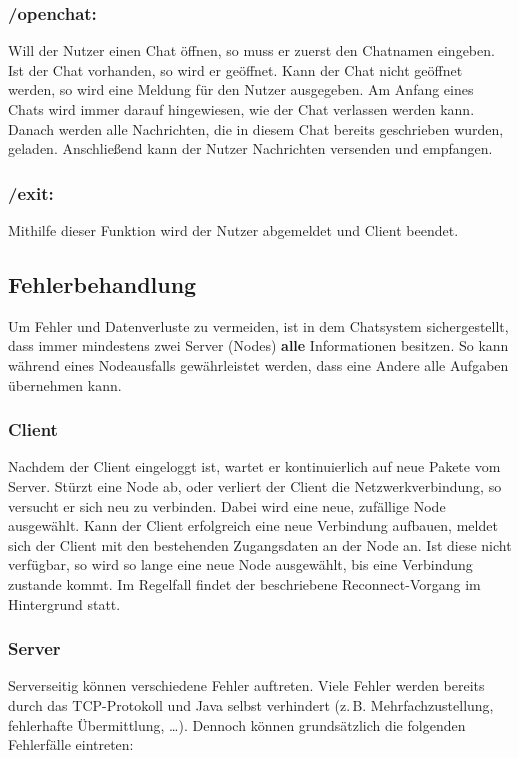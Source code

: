 \subsubsection*{/openchat:}
Will der Nutzer einen Chat öffnen, so muss er zuerst den Chatnamen eingeben. Ist der Chat vorhanden, so wird er geöffnet.
Kann der Chat nicht geöffnet werden, so wird eine Meldung für den Nutzer ausgegeben.
Am Anfang eines Chats wird immer darauf hingewiesen, wie der Chat
verlassen werden kann. Danach werden alle Nachrichten, die in diesem Chat bereits geschrieben wurden, geladen.
Anschließend kann der Nutzer Nachrichten versenden und empfangen.

\subsubsection*{/exit:}
Mithilfe dieser Funktion wird der Nutzer abgemeldet und Client beendet.

\author{Matthias Vonend, Aaron Schweig, Troy Keßler}
\subsection{Fehlerbehandlung}
Um Fehler und Datenverluste zu vermeiden, ist in dem Chatsystem sichergestellt, dass immer mindestens zwei Server (Nodes) \textbf{alle}
Informationen besitzen. So kann während eines Nodeausfalls gewährleistet werden, dass eine Andere alle Aufgaben übernehmen kann.

\subsubsection{Client}
Nachdem der Client eingeloggt ist, wartet er kontinuierlich auf neue Pakete vom Server. Stürzt eine Node ab, oder verliert der Client
die Netzwerkverbindung, so versucht er sich neu zu verbinden. Dabei wird eine neue, zufällige Node ausgewählt.
Kann der Client erfolgreich eine neue Verbindung aufbauen, meldet sich der Client mit den bestehenden Zugangsdaten an der Node an.
Ist diese nicht verfügbar, so wird so lange eine neue Node ausgewählt, bis eine Verbindung zustande kommt.
Im Regelfall findet der beschriebene Reconnect-Vorgang im Hintergrund statt.

\subsubsection{Server}
Serverseitig können verschiedene Fehler auftreten. Viele Fehler werden bereits durch das TCP-Protokoll und Java selbst verhindert 
(z.\,B. Mehrfachzustellung, fehlerhafte Übermittlung, \dots). Dennoch können grundsätzlich die folgenden Fehlerfälle eintreten:

